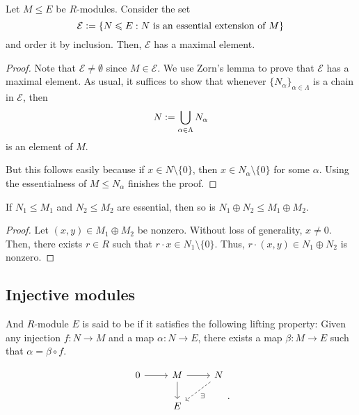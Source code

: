 \begin{prop} \label{prop:maximal-essential-extension}
	Let $M \le E$ be $R$-modules. Consider the set
	\begin{equation*} 
		\mathcal{E} \vcentcolon= \{N \le E : N \text{ is an essential extension of } M\}
	\end{equation*}
	and order it by inclusion. Then, $\mathcal{E}$ has a maximal element.
\end{prop}
\begin{proof} 
	Note that $\mathcal{E} \neq \emptyset$ since $M \in \mathcal{E}$. We use Zorn's lemma to prove that $\mathcal{E}$ has a maximal element. As usual, it suffices to show that whenever $\{N_{\alpha}\}_{\alpha \in \Lambda}$ is a chain in $\mathcal{E}$, then
	\begin{equation*} 
		N \vcentcolon= \bigcup_{\alpha \in \Lambda} N_{\alpha}
	\end{equation*}
	is an element of $M$. 

	But this follows easily because if $x \in N \setminus \{0\}$, then $x \in N_{\alpha} \setminus \{0\}$ for some $\alpha$. Using the essentialness of $M \le N_{\alpha}$ finishes the proof.
\end{proof}

\begin{prop}
	If $N_{1} \le M_{1}$ and $N_{2} \le M_{2}$ are essential, then so is $N_{1} \oplus N_{2} \le M_{1} \oplus M_{2}$.
\end{prop}
\begin{proof} 
	Let $(x, y) \in M_{1} \oplus M_{2}$ be nonzero. Without loss of generality, $x \neq 0$. Then, there exists $r \in R$ such that $r \cdot x \in N_{1} \setminus \{0\}$. Thus, $r \cdot (x, y) \in N_{1} \oplus N_{2}$ is nonzero.
\end{proof}

\subsection{Injective modules}

\begin{defn}
	And $R$-module $E$ is said to be  if it satisfies the following lifting property: Given any injection $f : N \to M$ and a map $\alpha : N \to E$, there exists a map $\beta : M \to E$ such that $\alpha = \beta \circ f$.

	\begin{equation*} 
		\begin{tikzcd}
			0 \arrow[r] & M \arrow[d] \arrow[r] & N \arrow[ld, dashed, "\exists"] \\
			  & E & \\
		\end{tikzcd}.
	\end{equation*}
\end{defn}

